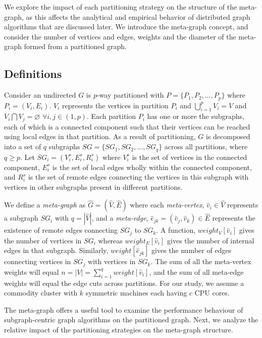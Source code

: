 \documentclass[10pt,conference, compsocconf]{IEEEtran}
\begin{document}
We explore the impact of each partitioning strategy on the structure of the meta-graph, as this affects the analytical and empirical behavior of distributed graph algorithms that are discussed later. We introduce the meta-graph concept, and consider the number of vertices and edges, weights and the diameter of the meta-graph formed from a partitioned graph. 


\subsection{Definitions}
\label{sec:analysis:definition}
Consider an undirected $G$ is $p$-way partitioned with $P = \{P_1, P_2, ...,P_p\}$ where $P_i = (V_i, E_i)$.  $V_i$ represents the vertices in partition $P_i$ and $ \bigcup_{i=1}^p V_i = V$  and $V_i \bigcap V_j = \varnothing$ $\forall i,j \in (1,p)$. Each partition $P_i$ has one or more the subgraphs, each of which is a connected component such that their vertices can be reached using local edges in that partition. As a result of partitioning, $G$ is decomposed into a set of $q$ subgraphs $SG = \{SG_1, SG_2, ..., SG_q\}$ across all partitions, where $q \ge p$. Let $SG_i = (V^s_i, E^s_i, R^s_i)$ where $V^s_i$ is the set of vertices in the connected component, $E^s_i$ is the set of local edges wholly within the connected component, and $R^s_i$ is the set of remote edges connecting the vertices in this subgraph with vertices in other subgraphs present in different partitions.



We define a \emph{meta-graph} as $\widehat{G} = (\widehat{V} , \widehat{E})$ where each \emph{meta-vertex}, $\widehat{v}_i \in \widehat{V}$ represents a subgraph $SG_i$ with $q=|\widehat{V}|$, and a \emph{meta-edge}, $\widehat{e}_{jk}= (\widehat{v}_j, \widehat{v}_k) \in \widehat{E}$ represents the existence of remote edges connecting $SG_j$ to $SG_k$. A function, $weight_V[\widehat{v}_i]$ gives the number of vertices in $SG_i$ whereas $weight_E[\widehat{v}_i]$ gives the number of internal edges in that subgraph. Similarly, $weight[\widehat{e}_{jk}]$ gives the number of edges connecting vertices in $SG_j$ with vertices in $SG_k$. The sum of all the meta-vertex weights will equal $n=|V|=\sum_{i=1}^q weight[\widehat{v}_{i}]$, and the sum of all meta-edge weights will equal the edge cuts across partitions. For our study, we assume a commodity cluster with $k$ symmetric machines each having $c$ CPU cores.

The meta-graph offers a useful tool to examine the performance behaviour of subgraph-centric graph algorithms on the partitioned graph. Next, we analyze the relative impact of the partitioning strategies on the meta-graph structure.
\end{document}
